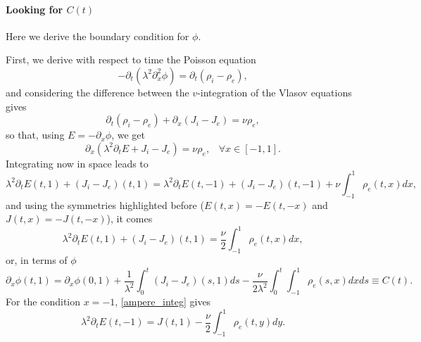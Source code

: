 \documentclass[12pt,english]{article}
\theoremstyle{plain}\newtheorem{theorem}{Theorem}[section]
\theoremstyle{plain}\newtheorem{corollary}{Corollary}[section]
\theoremstyle{plain}\newtheorem{lemma}{Lemma}[section]
\begin{document}

\paragraph{Looking for $C(t)$\\}
Here we derive the boundary condition for $\phi$. 

First, we derive with respect to time the Poisson equation 
$$
-\partial_t (\lambda^2\partial_x^2 \phi) = \partial_t (\rho_i- \rho_e), 
$$
and considering the difference between the $v$-integration of the Vlasov equations gives 
$$
\partial_t (\rho_i- \rho_e) + \partial_x (J_i-J_e) = \nu \rho_e, 
$$
so that, using $E=-\partial_x \phi$, we get 
$$
\partial_x (\lambda^2\partial_t E + J_i-J_e) = \nu \rho_e, \;\;\; \forall x\in [-1, 1]. 
$$
Integrating now in space leads to 
\begin{equation}
\label{ampere_integ}
\lambda^2\partial_t E(t, 1) + (J_i-J_e)(t, 1) = \lambda^2\partial_t E(t, -1) + (J_i-J_e)(t, -1) +\nu \int_{-1}^1 \rho_e(t, x)dx,  
\end{equation}
and using the symmetries highlighted before ($E(t,x)=-E(t, -x)$ and  $J(t,x)=-J(t, -x)$), it comes 
\begin{equation}
\label{ampere_bc}
\lambda^2\partial_t E(t, 1) + (J_i-J_e)(t, 1)  = \frac{\nu}{2} \int_{-1}^1 \rho_e(t, x)dx, 
\end{equation}
or, in terms of $\phi$ 
\begin{equation}
\label{ampere_bc_phi}
\partial_x \phi(t, 1) =\partial_x \phi(0, 1) +\frac{1}{\lambda^2}\int_0^t (J_i-J_e)(s, 1)ds - \frac{\nu}{2\lambda^2}\int_0^t  \int_{-1}^1 \rho_e(s, x)dx ds \equiv C(t). 
\end{equation}
For the condition $x=-1$, \eqref{ampere_integ} gives 
\begin{equation}
\label{ampere_bc_r}
\lambda^2\partial_t E(t, -1) = J(t, 1) - \frac{\nu}{2}\int_{-1}^1 \rho_e(t, y) dy. 
\end{equation}
\end{document}

